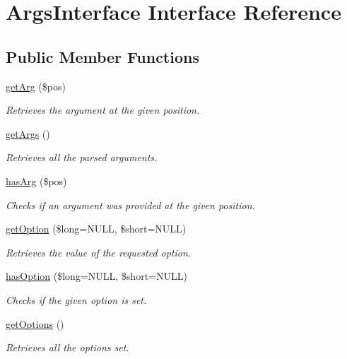 \hypertarget{interfaceArgsInterface}{\section{Args\-Interface Interface Reference}
\label{interfaceArgsInterface}
}
\subsection*{Public Member Functions}
\begin{DoxyCompactItemize}
\item 
\hyperlink{interfaceArgsInterface_a34626d1c4405623f3f09653b5faa2a46}{get\-Arg} (\$pos)
\begin{DoxyCompactList}\small\item\em Retrieves the argument at the given position. \end{DoxyCompactList}\item 
\hyperlink{interfaceArgsInterface_ace66d37cfc967a6bdf9b44a481a99c31}{get\-Args} ()
\begin{DoxyCompactList}\small\item\em Retrieves all the parsed arguments. \end{DoxyCompactList}\item 
\hyperlink{interfaceArgsInterface_ab9d274d933e8996abb4b17332d6647e3}{has\-Arg} (\$pos)
\begin{DoxyCompactList}\small\item\em Checks if an argument was provided at the given position. \end{DoxyCompactList}\item 
\hyperlink{interfaceArgsInterface_ac042f98cd4991ae95dc35e7ec7dcce02}{get\-Option} (\$long=N\-U\-L\-L, \$short=N\-U\-L\-L)
\begin{DoxyCompactList}\small\item\em Retrieves the value of the requested option. \end{DoxyCompactList}\item 
\hyperlink{interfaceArgsInterface_aae2e5e921a64065ee41df010172bf875}{has\-Option} (\$long=N\-U\-L\-L, \$short=N\-U\-L\-L)
\begin{DoxyCompactList}\small\item\em Checks if the given option is set. \end{DoxyCompactList}\item 
\hyperlink{interfaceArgsInterface_ac3ee7eb1bc25715e9aea8b835d71bfff}{get\-Options} ()
\begin{DoxyCompactList}\small\item\em Retrieves all the options set. \end{DoxyCompactList}\end{DoxyCompactItemize}



